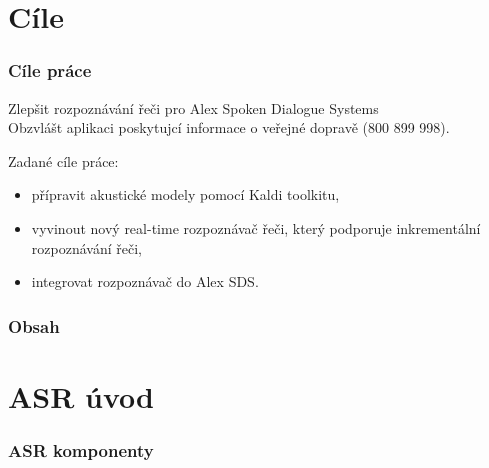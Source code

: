 

\maketitle


\section{Cíle} %

\begin{frame}\frametitle{Cíle práce} 
    Zlepšit rozpoznávání řeči pro Alex Spoken Dialogue Systems \\
    Obzvlášt aplikaci poskytujcí informace o veřejné dopravě (800 899 998).
        \begin{exampleblock}{Zadané cíle práce:}
        \begin{itemize}
            \item přípravit akustické modely pomocí Kaldi toolkitu,
            \item vyvinout nový real-time rozpoznávač řeči, který podporuje inkrementální rozpoznávání řeči,
            \item integrovat rozpoznávač do Alex SDS.
        \end{itemize}
    \end{exampleblock}
\end{frame}

\begin{frame} \frametitle{Obsah} \tableofcontents \end{frame}

\section{ASR úvod} %

\begin{frame}\frametitle{ASR komponenty} 
    
\end{frame}

